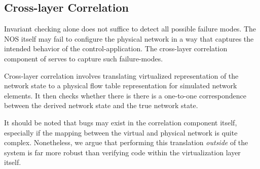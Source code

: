 \subsection{Cross-layer Correlation}
\label{sec:cross_layer_correlation}

Invariant checking alone does not suffice to detect all possible failure
modes. The NOS itself may fail to configure the physical network in a way that
captures the intended behavior of the control-application. The cross-layer correlation
component of \projectname{} serves to capture such failure-modes. 

Cross-layer correlation involves translating
virtualized representation of the network state to a physical flow table
representation for simulated network elements. It then checks whether there is
there is a one-to-one correspondence between the derived network
state and the true network state.

It should be noted that bugs may exist in the correlation component itself,
especially if the mapping between the virtual and physical network is quite
complex. Nonetheless, we argue that performing this
translation {\it outside} of the system is far more robust than verifying code within the
virtualization layer itself.


